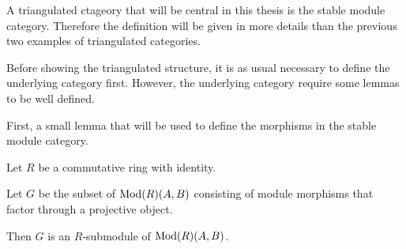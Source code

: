 
A triangulated ctageory that will be central in this thesis is the stable module category. Therefore the definition will be given in more details than the previous two examples of triangulated categories.

Before showing the triangulated structure, it is as usual necessary to define the underlying category first. However, the underlying category require some lemmas to be well defined.

First, a small lemma that will be used to define the morphisms in the stable module category.

\begin{lemma}
    \label{lem:morphisms_factoring_through_projectives_r-submodule}
    Let \( R \) be a commutative ring with identity.

    Let \( G \) be the subset of \( \operatorname{Mod}(R)(A, B) \) consisting of module morphisms that factor through a projective object.

    Then \( G \) is an \( R \)-submodule of \( \operatorname{Mod}(R)(A, B) \).
\end{lemma}
